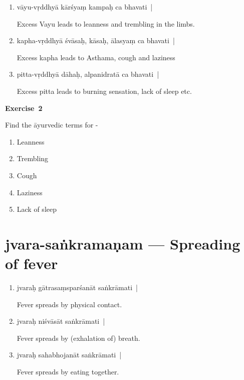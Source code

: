 \begin{enumerate}
\itemsep=0pt
\item {}

vāyu-vṛddhyā kārśyaṃ kampaḥ ca bhavati~|

Excess Vayu leads to leanness and trembling in the limbs.

\item {}

kapha-vṛddhyā śvāsaḥ, kāsaḥ, ālasyaṃ ca bhavati~|

Excess kapha leads to Asthama, cough and laziness

\item {}

pitta-vṛddhyā dāhaḥ, alpanidratā ca bhavati~|  

Excess pitta leads to burning sensation, lack of sleep etc.
\end{enumerate}

\centerline{\textbf{Exercise~2}}

Find the āyurvedic terms for -
\begin{enumerate}
\itemsep=0pt
\renewcommand{\theenumi}{\alph{enumi}}
\renewcommand{\labelenumi}{\theenumi.}
\item Leanness
\item Trembling
\item Cough 
\item Laziness 
\item Lack of sleep 
\end{enumerate}

\chapter{jvara-saṅkramaṇam --- Spreading of fever}

\begin{enumerate}
\item {}

jvaraḥ gātrasaṃsparśanāt saṅkrāmati~|

Fever spreads by physical contact.

\item {}

jvaraḥ niśvāsāt saṅkrāmati~|

Fever spreads by (exhalation of) breath. 

\item {}

jvaraḥ sahabhojanāt saṅkrāmati~|

Fever spreads by eating together.
\end{enumerate}

